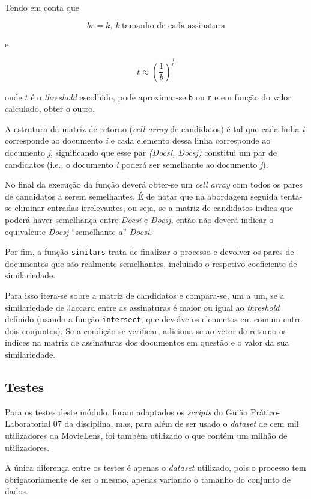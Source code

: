 \documentclass[a4paper,11pt,openright,oneside]{report}
\begin{document}
Tendo em conta que

$$ br = k,\ k\ \text{tamanho de cada assinatura} $$

e

$$ t \approx \left(\frac{1}{b}\right) ^ {\frac{1}{r}} $$

onde $t$ é o \textit{threshold} escolhido, pode aproximar-se \texttt{b} ou \texttt{r} e em função do valor calculado, obter o outro.

A estrutura da matriz de retorno (\textit{cell array} de candidatos) é tal que cada linha \textit{i} corresponde ao documento \textit{i} e cada elemento dessa linha corresponde ao documento \textit{j}, significando que esse par \textit{(Docs{i}, Docs{j})} constitui um par de candidatos (i.e., o documento \textit{i} poderá ser semelhante ao documento \textit{j}).

No final da execução da função deverá obter-se um \textit{cell array} com todos os pares de candidatos a serem semelhantes. É de notar que na abordagem seguida tenta-se eliminar entradas irrelevantes, ou seja, se a matriz de candidatos indica que poderá haver semelhança entre \textit{Docs{i}} e \textit{Docs{j}}, então não deverá indicar o equivalente \textit{Docs{j}} ``semelhante a'' \textit{Docs{i}}.

Por fim, a função \texttt{similars} trata de finalizar o processo e devolver os pares de documentos que são realmente semelhantes, incluindo o respetivo coeficiente de similariedade.

Para isso itera-se sobre a matriz de candidatos e compara-se, um a um, se a similariedade de Jaccard entre as assinaturas é maior ou igual ao \textit{threshold} definido (usando a função \texttt{intersect}, que devolve os elementos em comum entre dois conjuntos). Se a condição se verificar, adiciona-se ao vetor de retorno os índices na matriz de assinaturas dos documentos em questão e o valor da sua similariedade.

\subsection{Testes}
\label{subsec.lshtests}

Para os testes deste módulo, foram adaptados os \textit{scripts} do Guião Prático-Laboratorial 07 da disciplina, mas, para além de ser usado o \textit{dataset} de cem mil utilizadores da MovieLens, foi também utilizado o que contém um milhão de utilizadores.

A única diferença entre os testes é apenas o \textit{dataset} utilizado, pois o processo tem obrigatoriamente de ser o mesmo, apenas variando o tamanho do conjunto de dados.
\end{document}
